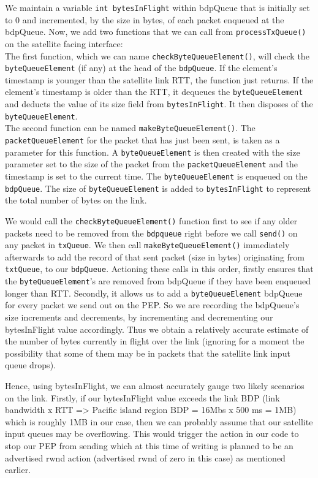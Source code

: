 We maintain a variable {\tt int bytesInFlight} within bdpQueue that is initially set to 0 and incremented, by the size in bytes, of each packet enqueued at the bdpQueue. Now, we add two functions that we can call from {\tt processTxQueue()} on the satellite facing interface: \\

The first function, which we can name {\tt checkByteQueueElement()}, will check the {\tt byteQueueElement} (if any) at the head of the {\tt bdpQueue}. If the element's timestamp is younger than the satellite link RTT, the function just returns. If the element's timestamp is older than the RTT, it dequeues the {\tt byteQueueElement} and deducts the value of its size field from {\tt bytesInFlight}. It then disposes of the {\tt byteQueueElement}. \\

The second function can be named {\tt makeByteQueueElement()}. The {\tt packetQueueElement} for the packet that has just been sent, is taken as a parameter for this function. A {\tt byteQueueElement} is then created with the size parameter set to the size of the packet from the {\tt packetQueueElement} and the timestamp is set to the current time. The {\tt byteQueueElement} is enqueued on the {\tt bdpQueue}. The size of {\tt byteQueueElement} is added to {\tt bytesInFlight} to represent the total number of bytes on the link.

We would call the {\tt checkByteQueueElement()} function first to see if any older packets need to be removed from the {\tt bdpqueue} right before we call {\tt send()} on any packet in {\tt txQueue}. We then call {\tt makeByteQueueElement()} immediately afterwards to add the record of that sent packet (size in bytes) originating from {\tt txtQueue}, to our {\tt bdpQueue}. Actioning these calls in this order, firstly ensures that the {\tt byteQueueElement}'s are removed from bdpQueue if they have been enqueued longer than RTT. Secondly, it allows us to add a {\tt byteQueueElement} bdpQueue for every packet we send out on the PEP. So we are recording the bdpQueue's size increments and decrements, by incrementing and decrementing our bytesInFlight value accordingly. Thus we obtain a relatively accurate estimate of the number of bytes currently in flight over the link (ignoring for a moment the possibility that some of them may be in packets that the satellite link input queue drops). 

Hence, using bytesInFlight, we can almost accurately gauge two likely scenarios on the link. Firstly, if our bytesInFlight value exceeds the link BDP (link bandwidth x RTT => Pacific island region BDP = 16Mbs x 500 ms = 1MB) which is roughly 1MB in our case, then we can probably assume that our satellite input queues may be overflowing. This would trigger the action in our code to stop our PEP from sending which at this time of writing is planned to be an advertised rwnd action (advertised rwnd of zero in this case) as mentioned earlier. \\

